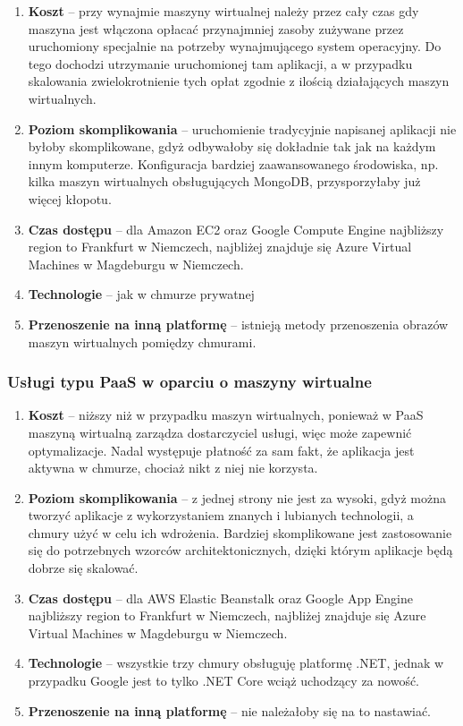\documentclass[12pt,a4paper,twoside,titlepage,openright]{book}
\begin{document}
\begin{enumerate}
	\item \textbf{Koszt} -- przy wynajmie maszyny wirtualnej należy przez cały czas gdy maszyna jest włączona opłacać przynajmniej zasoby zużywane przez uruchomiony specjalnie na potrzeby wynajmującego system operacyjny. Do tego dochodzi utrzymanie uruchomionej tam aplikacji, a w przypadku skalowania zwielokrotnienie tych opłat zgodnie z ilością działających maszyn wirtualnych.
	\item \textbf{Poziom skomplikowania} -- uruchomienie tradycyjnie napisanej aplikacji nie byłoby skomplikowane, gdyż odbywałoby się dokładnie tak jak na każdym innym komputerze. Konfiguracja bardziej zaawansowanego środowiska, np. kilka maszyn wirtualnych obsługujących MongoDB, przysporzyłaby już więcej kłopotu.
	\item \textbf{Czas dostępu} -- dla Amazon EC2 oraz Google Compute Engine najbliższy region to Frankfurt w Niemczech, najbliżej znajduje się Azure Virtual Machines w Magdeburgu w Niemczech.
	\item \textbf{Technologie} -- jak w chmurze prywatnej
	\item \textbf{Przenoszenie na inną platformę} -- istnieją metody przenoszenia obrazów maszyn wirtualnych pomiędzy chmurami.
\end{enumerate}


\subsubsection{Usługi typu PaaS w oparciu o maszyny wirtualne}

\begin{enumerate}
	\item \textbf{Koszt} -- niższy niż w przypadku maszyn wirtualnych, ponieważ w PaaS maszyną wirtualną zarządza dostarczyciel usługi, więc może zapewnić optymalizacje. Nadal występuje płatność za sam fakt, że aplikacja jest aktywna w chmurze, chociaż nikt z niej nie korzysta.
	\item \textbf{Poziom skomplikowania} -- z jednej strony nie jest za wysoki, gdyż można tworzyć aplikacje z wykorzystaniem znanych i lubianych technologii, a chmury użyć w celu ich wdrożenia. Bardziej skomplikowane jest zastosowanie się do potrzebnych wzorców architektonicznych, dzięki którym aplikacje będą dobrze się skalować.
	\item \textbf{Czas dostępu} -- dla AWS Elastic Beanstalk oraz Google App Engine najbliższy region to Frankfurt w Niemczech, najbliżej znajduje się Azure Virtual Machines w Magdeburgu w Niemczech.
	\item \textbf{Technologie} -- wszystkie trzy chmury obsługuję platformę .NET, jednak w przypadku Google jest to tylko .NET Core wciąż uchodzący za nowość.
	\item \textbf{Przenoszenie na inną platformę} -- nie należałoby się na to nastawiać.
\end{enumerate}
\end{document}

